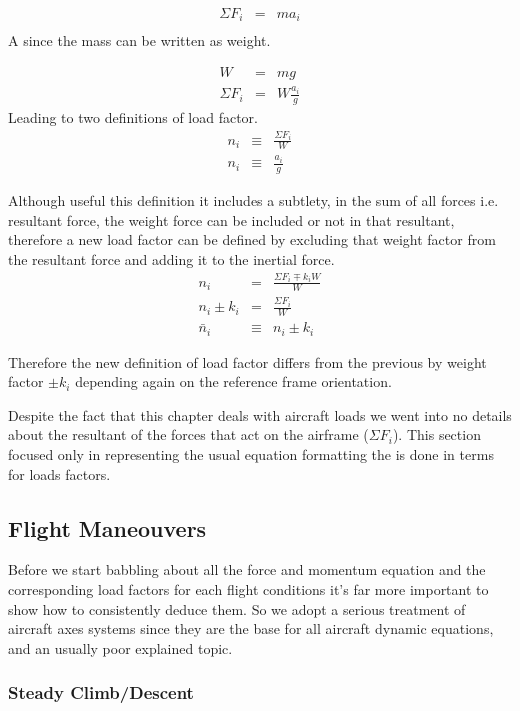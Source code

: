\begin{eqnarray}
\Sigma F_i &=& m a_i \\
\end{eqnarray}
A since the mass can be written as weight.



\begin{eqnarray}
W &=& m g \\
\Sigma F_i &=& W \frac{a_i}{g}
\end{eqnarray}
Leading to two definitions of load factor.
\begin{eqnarray}
n_i &\equiv& \frac{\Sigma F_i}{W} \\
n_i &\equiv& \frac{a_i}{g}
\end{eqnarray}

Although useful this definition it includes a subtlety, in the sum of all forces i.e. resultant force, the weight force can be included
or not in that resultant, therefore a new load factor can be defined by excluding that weight factor from the resultant force and adding it to the inertial force.
\begin{eqnarray}
n_i &=& \frac{\Sigma F_i \mp k_iW}{W} \\
n_i \pm k_i &=& \frac{\Sigma F_i}{W} \\
\bar{n}_i &\equiv& n_i \pm k_i
\end{eqnarray}

Therefore the new definition of load factor differs from the previous by weight factor $\pm k_i$ depending again on the reference frame orientation.

Despite the fact that this chapter deals with aircraft loads we went into no details about the resultant of the forces that act on the
airframe ($\Sigma F_i$). This section focused only in representing the usual equation formatting the is done in terms for loads factors.



\subsection{Flight Maneouvers}
Before we start babbling about all the force and momentum equation and the
corresponding load factors for each flight conditions it's far more important
to show how to consistently deduce them. So we adopt a serious treatment of aircraft axes systems since they are the base for
all aircraft dynamic equations, and an usually poor explained topic.

\subsubsection{Steady Climb/Descent}

